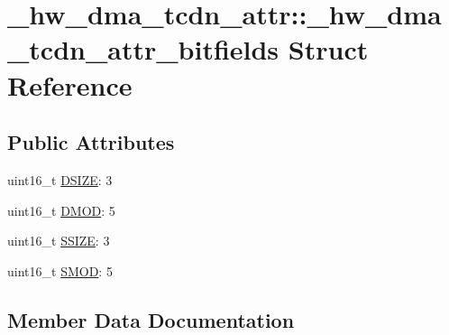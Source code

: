\hypertarget{struct__hw__dma__tcdn__attr_1_1__hw__dma__tcdn__attr__bitfields}{}\section{\+\_\+hw\+\_\+dma\+\_\+tcdn\+\_\+attr\+:\+:\+\_\+hw\+\_\+dma\+\_\+tcdn\+\_\+attr\+\_\+bitfields Struct Reference}
\label{struct__hw__dma__tcdn__attr_1_1__hw__dma__tcdn__attr__bitfields}
\subsection*{Public Attributes}
\begin{DoxyCompactItemize}
\item 
uint16\+\_\+t \hyperlink{struct__hw__dma__tcdn__attr_1_1__hw__dma__tcdn__attr__bitfields_aaa0da1432ba029116d50c46be2889e0c}{D\+S\+I\+ZE}\+: 3
\item 
uint16\+\_\+t \hyperlink{struct__hw__dma__tcdn__attr_1_1__hw__dma__tcdn__attr__bitfields_aa6cdb515b13882e3e65a1145badb8cda}{D\+M\+OD}\+: 5
\item 
uint16\+\_\+t \hyperlink{struct__hw__dma__tcdn__attr_1_1__hw__dma__tcdn__attr__bitfields_ae2865466d5cf5fbc08d39693e5db1020}{S\+S\+I\+ZE}\+: 3
\item 
uint16\+\_\+t \hyperlink{struct__hw__dma__tcdn__attr_1_1__hw__dma__tcdn__attr__bitfields_aeaf11daa637995e2ae94d43534aa7cbf}{S\+M\+OD}\+: 5
\end{DoxyCompactItemize}


\subsection{Member Data Documentation}
